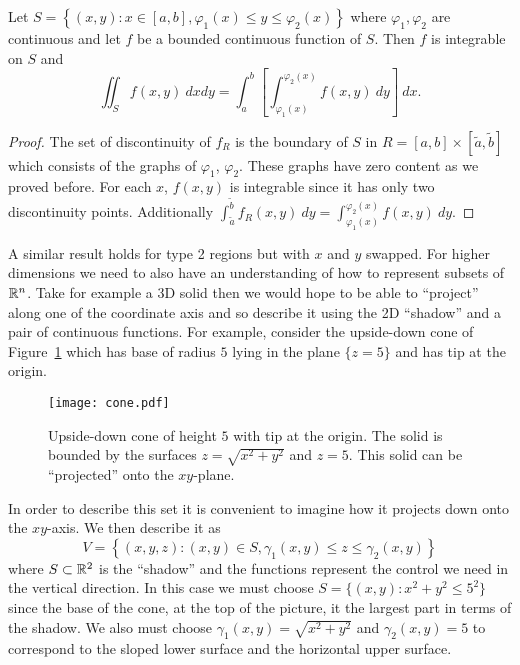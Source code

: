 \begin{theorem}
    Let \(S = \left\{(x,y): x \in [a,b], \varphi_1(x) \leq y \leq \varphi_2(x)\right\}\) where \(\varphi_1, \varphi_2\) are continuous and let \(f\) be a bounded continuous function of \(S\).
    Then \(f\) is integrable on \(S\) and
    \[
        \iint_{S} f(x,y) \ dx dy = \int_{a}^{b} \left[\int_{\varphi_1(x)}^{\varphi_2(x)} f(x,y) \ dy\right] \ dx.
    \]
\end{theorem}
%
\begin{proof}
    The set of discontinuity of \(f_{R}\) is the boundary of \(S\) in \(R=[a,b]\times[\tilde a,\tilde b]\) which consists of the graphs of \(\varphi_1\), \(\varphi_2\).
    These graphs have zero content as we proved before.
    For each \(x\), \(f(x,y)\) is integrable since it has only two discontinuity points.
    Additionally \(\int_{\tilde a}^{\tilde b} f_{R}(x,y) \ dy =  \int_{\varphi_1(x)}^{\varphi_2(x)} f(x,y) \ dy \).
\end{proof}
%
A similar result holds for type 2 regions but with \(x\) and \(y\) swapped.
For higher dimensions we need to also have an understanding of how to represent subsets of \(\mathbb{R}^n\).
Take for example a 3D solid then we would hope to be able to ``project'' along one of the coordinate axis and so describe it using the 2D ``shadow'' and a pair of continuous functions.
For example, consider the upside-down cone of Figure~\ref{fig:cone} which has base of radius \(5\) lying in the plane \(\{z=5\}\) and has tip at the origin.
%
\begin{figure}
    \centering
    \texttt{[image: cone.pdf]}
    \caption{Upside-down cone of height \(5\) with tip at the origin. The solid is bounded by the surfaces \(z = \sqrt{x^2+y^2}\) and \(z=5\). This solid can be ``projected'' onto the \(xy\)-plane.}%
    \label{fig:cone}
\end{figure}
%
In order to describe this set it is convenient to imagine how it projects down onto the \(xy\)-axis.
We then describe it as
\[
    V = \left\{(x,y,z) : (x,y) \in S, \gamma_1(x,y)\leq z \leq \gamma_2(x,y) \right\}
\]
where \(S \subset \mathbb{R}^2\) is the ``shadow'' and the functions represent the control we need in the vertical direction.
In this case we must choose \(S = \{(x,y): x^2 + y^2 \leq 5^2\}\)since the base of the cone, at the top of the picture, it the largest part in terms of the shadow.
We also must choose \(\gamma_1(x,y) = \sqrt{x^2 + y^2}\) and \(\gamma_2(x,y) = 5\) to correspond to the sloped lower surface and the horizontal upper surface.

